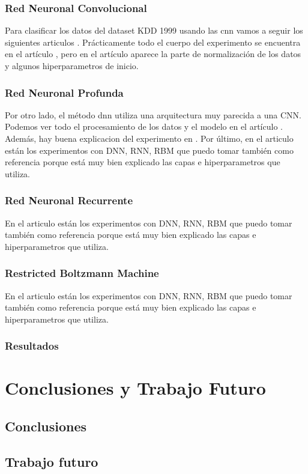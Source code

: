 \documentclass[12pt,a4paper]{book}
\begin{document}
\subsection{Red Neuronal Convolucional}
Para clasificar los datos del dataset KDD 1999 usando las \gls{cnn} vamos a seguir los siguientes articulos \citep{kim2020cnn, yang2006anomaly, nguyen2018design, kim2018encoding}. Prácticamente todo el cuerpo del experimento se encuentra en el artículo \citep{kim2020cnn}, pero en el artículo \citep{kim2018encoding} aparece la parte de normalización de los datos y algunos hiperparametros de inicio.

\subsection{Red Neuronal Profunda}
Por otro lado, el método \gls{dnn} utiliza una arquitectura muy parecida a una CNN. Podemos ver todo el procesamiento de los datos y el modelo en el artículo \citep{maithem2021network}. Además, hay buena explicacion del experimento en \citep{vigneswaran2018evaluating}. Por último, en el articulo \citep{elmasry2019empirical} están los experimentos con DNN, RNN,  RBM que puedo tomar también como referencia porque está muy bien explicado las capas e hiperparametros que utiliza.

\subsection{Red Neuronal Recurrente}
En el articulo \citep{elmasry2019empirical} están los experimentos con DNN, RNN,  RBM que puedo tomar también como referencia porque está muy bien explicado las capas e hiperparametros que utiliza.

\subsection{Restricted Boltzmann Machine}
En el articulo \citep{elmasry2019empirical} están los experimentos con DNN, RNN,  RBM que puedo tomar también como referencia porque está muy bien explicado las capas e hiperparametros que utiliza.

\subsection{Resultados}




\chapter{Conclusiones y Trabajo Futuro} \label{Capítulo 6}



\section{Conclusiones} \label{Subsec: 6_1}



\section{Trabajo futuro} \label{Subsec: 6_2}



  
\newpage

\medskip
\nocite{*}


\clearpage

\newpage

\appendix

\printglossary
\end{document}
